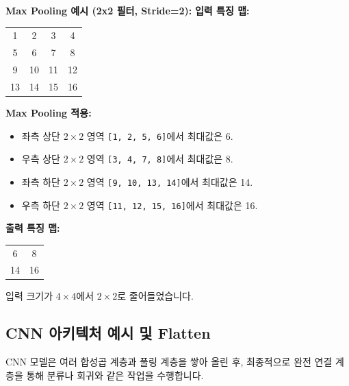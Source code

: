 \documentclass[11pt,a4paper]{article}
\begin{document}
\begin{examplebox}
\textbf{Max Pooling 예시 (2x2 필터, Stride=2):}
\textbf{입력 특징 맵:}
\begin{tabular}{cccc}
\toprule
1 & 2 & 3 & 4 \\
5 & 6 & 7 & 8 \\
9 & 10 & 11 & 12 \\
13 & 14 & 15 & 16 \\
\bottomrule
\end{tabular}

\textbf{Max Pooling 적용:}
\begin{itemize}
    \item 좌측 상단 $2 \times 2$ 영역 \texttt{[1, 2, 5, 6]}에서 최대값은 6.
    \item 우측 상단 $2 \times 2$ 영역 \texttt{[3, 4, 7, 8]}에서 최대값은 8.
    \item 좌측 하단 $2 \times 2$ 영역 \texttt{[9, 10, 13, 14]}에서 최대값은 14.
    \item 우측 하단 $2 \times 2$ 영역 \texttt{[11, 12, 15, 16]}에서 최대값은 16.
\end{itemize}
\textbf{출력 특징 맵:}
\begin{tabular}{cc}
\toprule
6 & 8 \\
14 & 16 \\
\bottomrule
\end{tabular}
입력 크기가 $4 \times 4$에서 $2 \times 2$로 줄어들었습니다.
\end{examplebox}

\subsection{CNN 아키텍처 예시 및 Flatten}

CNN 모델은 여러 합성곱 계층과 풀링 계층을 쌓아 올린 후, 최종적으로 완전 연결 계층을 통해 분류나 회귀와 같은 작업을 수행합니다.
\end{document}
